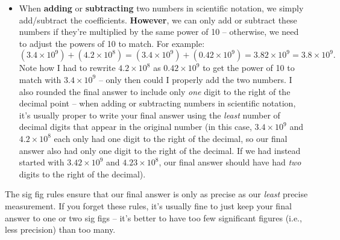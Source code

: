 \documentclass[11pt]{article}
\begin{document}
\begin{itemize}
    \item When \textbf{adding} or \textbf{subtracting} two numbers in scientific notation, we simply add/subtract the coefficients. \textbf{However}, we can only add or subtract these numbers if they're multiplied by the same power of 10 -- otherwise, we need to adjust the powers of 10 to match. For example:
    \begin{equation}
        (3.4 \times 10^9) + (4.2 \times 10^8) = (3.4 \times 10^9) + (0.42 \times 10^9) = 3.82 \times 10^9 = \boxed{3.8 \times 10^9}.
    \end{equation}
    Note how I had to rewrite $4.2 \times 10^8$ as $0.42 \times 10^9$ to get the power of 10 to match with $3.4 \times 10^9$ -- only then could I properly add the two numbers. I also rounded the final answer to include only \emph{one} digit to the right of the decimal point -- when adding or subtracting numbers in scientific notation, it's usually proper to write your final answer using the \emph{least} number of decimal digits that appear in the original number (in this case, $3.4 \times 10^9$ and $4.2 \times 10^8$ each only had one digit to the right of the decimal, so our final answer also had only one digit to the right of the decimal. If we had instead started with $3.42 \times 10^9$ and $4.23 \times 10^8$, our final answer should have had \emph{two} digits to the right of the decimal).    
\end{itemize}

The sig fig rules ensure that our final answer is only as precise as our \emph{least} precise measurement. If you forget these rules, it's usually fine to just keep your final answer to one or two sig figs -- it's better to have too few significant figures (i.e., less precision) than too many. 

\bigskip
\end{document}
